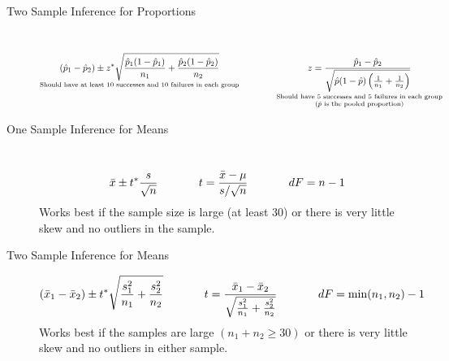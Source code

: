 \documentclass[11pt]{article}
\newcommand{\ds}{\displaystyle}
\begin{document}
\begin{description}
\item[Two Sample Inference for Proportions] ~%
\[
\underset{\text{Should have at least 10 successes and 10 failures in each group}}{\displaystyle(\hat{p}_1 - \hat{p}_2)  \pm z^* \sqrt{ \frac{\hat{p}_1(1-\hat{p}_1)}{n_1}+\frac{\hat{p}_2(1-\hat{p}_2)}{n_2} }} \hspace{0.5in} \underset{\scriptsize \begin{array}{c}\text{Should have 5 successes and 5 failures in each group} \\ (\hat{p} \text{ is the pooled proportion}) \end{array}}{ z = \frac{\hat{p}_1 - \hat{p}_2}{\sqrt{\hat{p}(1-\hat{p})\left( \frac{1}{n_1} + \frac{1}{n_2} \right)}} }
\]

\item[One Sample Inference for Means] ~
$${\bar{x} \pm t^* \frac{s}{\sqrt{n}} \hspace*{0.5in} \ds t = \frac{\bar{x} - \mu}{s/\sqrt{n}} \hspace*{0.5in} dF = n-1}$$
{\footnotesize Works best if the sample size is large (at least 30) or there is very little skew and no outliers in the sample. }

\item[Two Sample Inference for Means] 
\[
(\bar{x}_1 - \bar{x}_2) \pm t^* \sqrt{ \frac{s_1^2}{n_1} + \frac{s_2^2}{n_2} } \hspace*{0.5in} t = \frac{\bar{x}_1 - \bar{x}_2}{ \sqrt{ \frac{s_1^2}{n_1} + \frac{s_2^2}{n_2}} }  \hspace*{0.5in} dF = \min(n_1,n_2) - 1
\]
{\footnotesize Works best if the samples are large $(n_1 + n_2 \ge 30)$ or there is very little skew and no outliers in either sample. }

\end{description}
\end{document}
